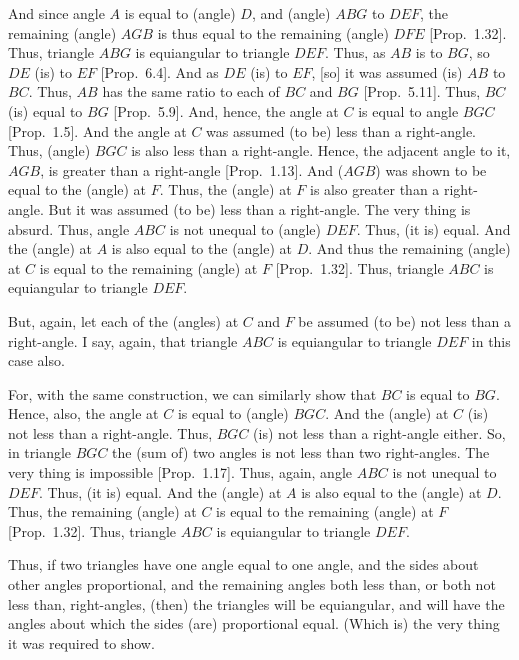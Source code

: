 \begin{Parallel}{}{}
{And since angle $A$ is equal to (angle) $D$, and (angle) $ABG$ to $DEF$, the remaining
(angle) $AGB$ is thus equal to the remaining (angle) $DFE$  [Prop.~1.32].
Thus, triangle $ABG$ is equiangular to triangle $DEF$. Thus, as $AB$ is to
$BG$, so $DE$ (is) to $EF$ [Prop.~6.4]. 
And as $DE$ (is) to $EF$, [so] it was assumed (is) $AB$ to $BC$. Thus, $AB$ has the
same ratio to each of $BC$ and $BG$ [Prop.~5.11].
Thus, $BC$ (is) equal to $BG$ [Prop.~5.9].
And, hence, the angle at $C$ is equal to angle $BGC$  [Prop.~1.5].
And the angle at $C$ was assumed (to be) less than a right-angle.
Thus, (angle) $BGC$ is also less than a right-angle. Hence, the adjacent
angle to it, $AGB$, is greater than a right-angle [Prop.~1.13].
And ($AGB$) was shown to be equal to the (angle) at $F$. Thus, the (angle)
at $F$ is also greater than a right-angle. But it was assumed (to be)
less than a right-angle. The very thing is absurd. Thus, angle $ABC$ is
not unequal to (angle) $DEF$. Thus, (it is) equal. And the (angle) at $A$ is also
equal to the (angle) at $D$. And thus the remaining (angle) at $C$ is equal
to the remaining (angle) at $F$  [Prop.~1.32]. Thus, triangle $ABC$
is equiangular to triangle $DEF$.

But, again, let each of the (angles) at $C$ and $F$ be assumed  (to be) not
less than a right-angle. I say, again, that triangle $ABC$
is equiangular to triangle $DEF$ in this case also.

For, with the same construction, we can similarly show that $BC$ is equal to $BG$.
Hence, also, the angle at $C$ is equal to (angle) $BGC$. And  the (angle) at $C$ (is)
not less than a right-angle. Thus, $BGC$ (is) not less than a right-angle
either. So, in triangle $BGC$ the (sum of) two angles is not less than two
right-angles. The very thing is impossible [Prop.~1.17]. Thus, again,
angle $ABC$ is not unequal to $DEF$. Thus, (it is) equal.  And the (angle) at $A$
is also equal to the (angle) at $D$. Thus, the remaining (angle) at $C$ is equal
to the remaining (angle) at $F$ [Prop.~1.32]. Thus, triangle $ABC$ is equiangular to triangle $DEF$.

Thus, if two triangles have one angle equal to one angle,
and the sides about  other angles proportional, and the remaining angles
both less than, or both not less than, right-angles, (then) the triangles will
be equiangular, and will have the angles about which the sides (are) proportional equal. (Which is) the very thing it was required to show.}
\end{Parallel}

